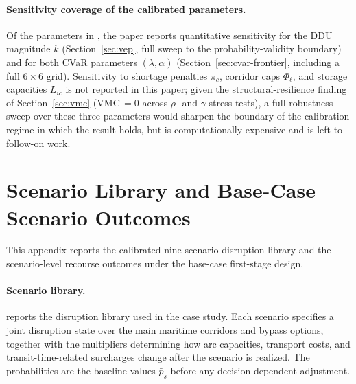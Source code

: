\documentclass[final,3p,authoryear]{elsarticle}
\theoremstyle{definition}
\begin{document}
\paragraph{Sensitivity coverage of the calibrated parameters.}
Of the parameters in , the paper reports
quantitative sensitivity for the DDU magnitude $k$
(Section~\ref{sec:vep}, full sweep to the probability-validity
boundary) and for both CVaR parameters $(\lambda, \alpha)$
(Section~\ref{sec:cvar-frontier}, including a full $6\times 6$ grid).
Sensitivity to shortage penalties $\pi_c$, corridor caps
$\bar\Phi_\ell$, and storage capacities $L_{ic}$ is not reported in
this paper; given the structural-resilience finding of
Section~\ref{sec:vmc} (VMC$\,=0$ across $\rho$- and $\gamma$-stress
tests), a full robustness sweep over these three parameters would
sharpen the boundary of the calibration regime in which the result
holds, but is computationally expensive and is left to follow-on work.

\section{Scenario Library and Base-Case Scenario Outcomes}
\label{app:basecase-additional}

This appendix reports the calibrated nine-scenario disruption library and
the scenario-level recourse outcomes under the base-case first-stage
design.

\paragraph{Scenario library.}
 reports the disruption library used in
the case study. Each scenario specifies a joint disruption state over
the main maritime corridors and bypass options, together with the
multipliers determining how arc capacities, transport costs, and
transit-time-related surcharges change after the scenario is realized.
The probabilities are the baseline values $\bar p_s$ before any
decision-dependent adjustment.
\end{document}

